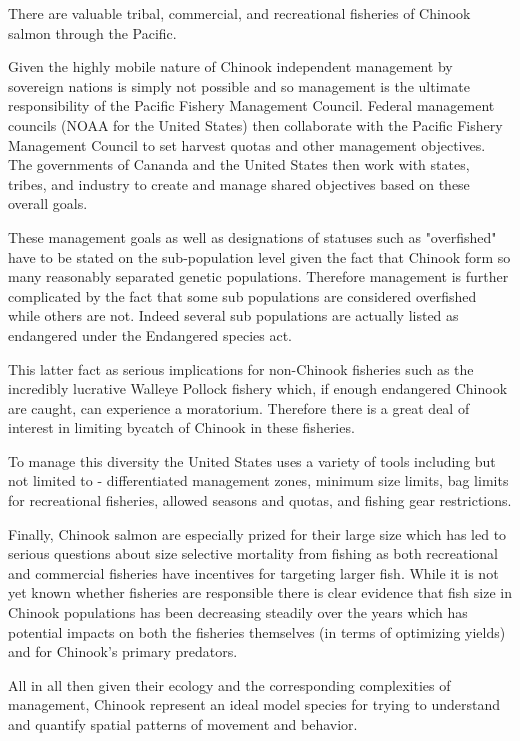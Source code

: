 \documentclass[11pt]{article}
\begin{document}
There are valuable tribal, commercial, and recreational fisheries of Chinook salmon through the Pacific.

Given the highly mobile nature of Chinook independent management by sovereign nations is simply not possible and so management is the ultimate responsibility of the Pacific Fishery Management Council. Federal management councils (NOAA for the United States) then collaborate with the Pacific Fishery Management Council to set harvest quotas and other management objectives. The governments of Cananda and the United States then work with states, tribes, and industry to create and manage shared objectives based on these overall goals. 

These management goals as well as designations of statuses such as "overfished" have to be stated on the sub-population level given the fact that Chinook form so many reasonably separated genetic populations. Therefore management is further complicated by the fact that some sub populations are considered overfished while others are not. Indeed several sub populations are actually listed as endangered under the Endangered species act.

This latter fact as serious implications for non-Chinook fisheries such as the incredibly lucrative Walleye Pollock fishery which, if enough endangered Chinook are caught, can experience a moratorium. Therefore there is a great deal of interest in limiting bycatch of Chinook in these fisheries. 

To manage this diversity the United States uses a variety of tools including but not limited to - differentiated management zones, minimum size limits, bag limits for recreational fisheries, allowed seasons and quotas, and fishing gear restrictions. \newline

Finally, Chinook salmon are especially prized for their large size which has led to serious questions about size selective mortality from fishing as both recreational and commercial fisheries have incentives for targeting larger fish. While it is not yet known whether fisheries are responsible there is clear evidence that fish size in Chinook populations has been decreasing steadily over the years which has potential impacts on both the fisheries themselves (in terms of optimizing yields) and for Chinook's primary predators. \newline


All in all then given their ecology and the corresponding complexities of management, Chinook represent an ideal model species for trying to understand and quantify spatial patterns of movement and behavior. 
\end{document}
